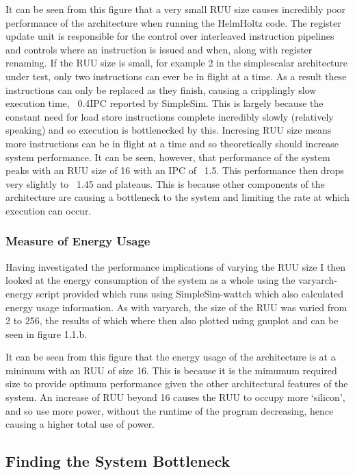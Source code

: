 \documentclass[paper=a4, fontsize=11pt]{scrartcl} %
\numberwithin{equation}{section} %
\numberwithin{figure}{section} %
\numberwithin{table}{section} %
\begin{document}
It can be seen from this figure that a very small RUU size causes incredibly poor performance of the architecture when running the HelmHoltz code.  The register update unit is responsible for the control over interleaved instruction pipelines and controls where an instruction is issued and when, along with register renaming.  If the RUU size is small, for example 2 in the simplescalar architecture under test, only two instructions can ever be in flight at a time.  As a result these instructions can only be replaced as they finish, causing a cripplingly slow execution time, ~0.4IPC reported by SimpleSim. This is largely because the constant need for load store instructions complete incredibly slowly (relatively speaking) and so execution is bottlenecked by this.  Incresing RUU size means more instructions can be in flight at a time and so theoretically should increase system performance.  It can be seen, however, that performance of the system peaks with an RUU size of 16 with an IPC of ~1.5.  This performance then drops very slightly to ~1.45 and plateaus.  This is because other components of the architecture are causing a bottleneck to the system and limiting the rate at which execution can occur.

\subsubsection{Measure of Energy Usage}

Having investigated the performance implications of varying the RUU size I then looked at the energy consumption of the system as a whole using the varyarch-energy script provided which runs using SimpleSim-wattch which also calculated energy usage information.  As with varyarch, the size of the RUU was varied from 2 to 256, the results of which where then also plotted using gnuplot and can be seen in figure 1.1.b.

It can be seen from this figure that the energy usage of the architecture is at a minimum with an RUU of size 16.  This is because it is the mimumum required size to provide optimum performance given the other architectural features of the system.  An increase of RUU beyond 16 causes the RUU to occupy more `silicon', and so use more power, without the runtime of the program decreasing, hence causing a higher total use of power.

\subsection{Finding the System Bottleneck}
\end{document}
